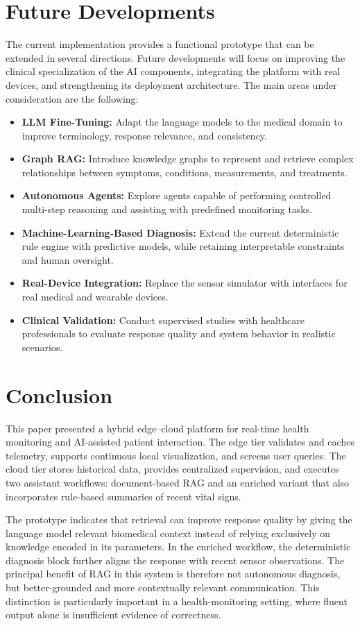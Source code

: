 \documentclass[runningheads]{llncs}
\begin{document}
\section{Future Developments}
The current implementation provides a functional prototype that can be extended in several directions. Future developments will focus on improving the clinical specialization of the AI components, integrating the platform with real devices, and strengthening its deployment architecture. The main areas under consideration are the following:

\begin{itemize}
\item \textbf{LLM Fine-Tuning:} Adapt the language models to the medical domain to improve terminology, response relevance, and consistency.
\item \textbf{Graph RAG:} Introduce knowledge graphs to represent and retrieve complex relationships between symptoms, conditions, measurements, and treatments.
\item \textbf{Autonomous Agents:} Explore agents capable of performing controlled multi-step reasoning and assisting with predefined monitoring tasks.
\item \textbf{Machine-Learning-Based Diagnosis:} Extend the current deterministic rule engine with predictive models, while retaining interpretable constraints and human oversight.
\item \textbf{Real-Device Integration:} Replace the sensor simulator with interfaces for real medical and wearable devices.
\item \textbf{Clinical Validation:} Conduct supervised studies with healthcare professionals to evaluate response quality and system behavior in realistic scenarios.
\end{itemize}

\section{Conclusion}
This paper presented a hybrid edge--cloud platform for real-time health monitoring and AI-assisted patient interaction. The edge tier validates and caches telemetry, supports continuous local visualization, and screens user queries. The cloud tier stores historical data, provides centralized supervision, and executes two assistant workflows: document-based RAG and an enriched variant that also incorporates rule-based summaries of recent vital signs.

The prototype indicates that retrieval can improve response quality by giving the language model relevant biomedical context instead of relying exclusively on knowledge encoded in its parameters. In the enriched workflow, the deterministic diagnosis block further aligns the response with recent sensor observations. The principal benefit of RAG in this system is therefore not autonomous diagnosis, but better-grounded and more contextually relevant communication. This distinction is particularly important in a health-monitoring setting, where fluent output alone is insufficient evidence of correctness.
\end{document}
